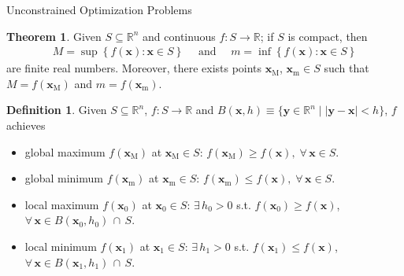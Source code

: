 \documentclass[10pt]{beamer}
\newcommand{\ds}{\displaystyle}
\theoremstyle{definition}
\newtheorem*{dfn}{Definition}
\newtheorem*{thm}{Theorem}
\newcommand{\vx}{\mathbf{x}}
\newcommand{\vy}{\mathbf{y}}
\begin{document}
\begin{frame}{Unconstrained Optimization Problems}
  \begin{thm}%
    Given $\ds S\subseteq\mathbb{R}^n$ and continuous $f: S\to\mathbb{R}$; if $S$ is compact, then  
    \begin{align*}
      M = \sup\left\{f(\vx): \vx\in S\right\}\quad\text{ and }\quad m = \inf\left\{f(\vx): \vx\in S\right\}
    \end{align*}
    are finite real numbers. Moreover, there exists points $\vx_\text{M}$, $\vx_\text{m}\in S$ such that $M = f(\vx_\text{M})$ and $m = f(\vx_\text{m})$.
  \end{thm}

  \begin{dfn}
    Given $\ds S\subseteq\mathbb{R}^n$, $\ds f:S\to\mathbb{R}$ and $\ds B(\vx, h)\equiv\{\vy\in\mathbb{R}^n\;|\;|\vy - \vx| < h\}$, $f$ achieves 
    \begin{itemize}
      \item global maximum $\ds f(\vx_\text{M})$ at $\ds\vx_\text{M}\in S$: $\ds f(\vx_\text{M})\geqslant f(\vx),\;\forall\,\vx\in S$. 
      \item global minimum $\ds f(\vx_\text{m})$ at $\ds \vx_\text{m}\in S$: $\ds f(\vx_\text{m})\leqslant f(\vx),\;\forall\,\vx\in S$. 
      \item local maximum $\ds f(\vx_0)$ at $\ds\vx_0\in S$: $\ds\exists\,h_0 > 0$ s.t. $\ds f(\vx_0)\geqslant f(\vx)$, $\ds\forall\,\vx\in B(\vx_0, h_0)\,\cap\,S$. 
      \item local minimum $\ds f(\vx_1)$ at $\ds\vx_1\in S$: $\ds\exists\,h_1 > 0$ s.t. $\ds f(\vx_1)\leqslant f(\vx)$, $\ds\forall\,\vx\in B(\vx_1, h_1)\,\cap\,S$. 
    \end{itemize}
  \end{dfn}
\end{frame}
\end{document}
